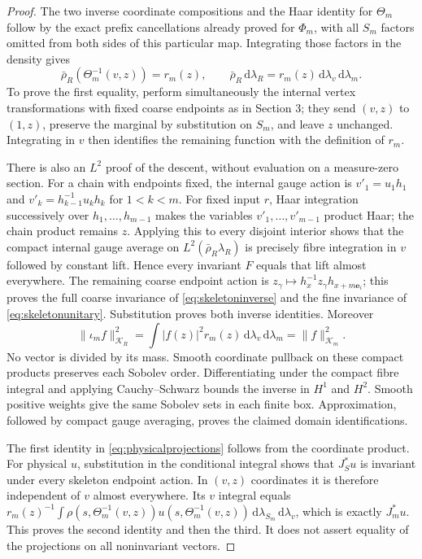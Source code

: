 \documentclass[11pt]{article}
\newcommand{\dd}{\,\mathrm d}
\newcommand{\KK}{\mathscr K}
\begin{document}
\begin{proof}
The two inverse coordinate compositions and the Haar identity for
$\Theta_m$ follow by the exact prefix cancellations already proved
for $\Phi_m$, with all $S_m$ factors omitted from both sides of
this particular map. Integrating those factors in the density gives
\[
 \bar\rho_R(\Theta_m^{-1}(v,z))=r_m(z),\qquad
 \bar\rho_R\dd\lambda_R=r_m(z)\dd\lambda_v\dd\lambda_m.
\]
To prove the first equality, perform simultaneously the internal
vertex transformations with fixed coarse endpoints as in Section 3;
they send $(v,z)$ to $(1,z)$, preserve the marginal by substitution
on $S_m$, and leave $z$ unchanged. Integrating in $v$ then identifies
the remaining function with the definition of $r_m$.

There is also an $L^2$ proof of the descent, without evaluation on
a measure-zero section. For a chain with endpoints fixed, the
internal gauge action is
$v'_1=u_1h_1$ and $v'_k=h_{k-1}^{-1}u_kh_k$ for $1<k<m$.
For fixed input $r$, Haar integration successively over
$h_1,\ldots,h_{m-1}$ makes the variables $v'_1,\ldots,v'_{m-1}$
product Haar; the chain product remains $z$. Applying this to every
disjoint interior shows that the compact internal gauge average on
$L^2(\bar\rho_R\lambda_R)$ is precisely fibre integration in $v$
followed by constant lift. Hence every invariant $F$ equals that
lift almost everywhere. The remaining coarse endpoint action is
$z_\gamma\mapsto h_x^{-1}z_\gamma h_{x+m\mathbf e_i}$; this proves
the full coarse invariance of \eqref{eq:skeletoninverse} and the
fine invariance of \eqref{eq:skeletonunitary}. Substitution proves
both inverse identities. Moreover
\[
 \|\iota_m f\|_{\mathcal K_R}^2
 =\int |f(z)|^2r_m(z)\dd\lambda_v\dd\lambda_m
 =\|f\|_{\KK_m}^2.
\]
No vector is divided by its mass. Smooth coordinate pullback on
these compact products preserves each Sobolev order. Differentiating
under the compact fibre integral and applying Cauchy--Schwarz bounds
the inverse in $H^1$ and $H^2$. Smooth positive weights give the
same Sobolev sets in each finite box. Approximation, followed by
compact gauge averaging, proves the claimed domain identifications.

The first identity in \eqref{eq:physicalprojections} follows from
the coordinate product. For physical $u$, substitution in the
conditional integral shows that $J_S^*u$ is invariant under every
skeleton endpoint action. In $(v,z)$ coordinates it is therefore
independent of $v$ almost everywhere. Its $v$ integral equals
$r_m(z)^{-1}\int\rho(s,\Theta_m^{-1}(v,z))
u(s,\Theta_m^{-1}(v,z))\dd\lambda_{S_m}\dd\lambda_v$,
which is exactly $J_m^*u$. This proves the second identity and then
the third. It does not assert equality of the projections on all
noninvariant vectors.


\end{proof}
\end{document}
